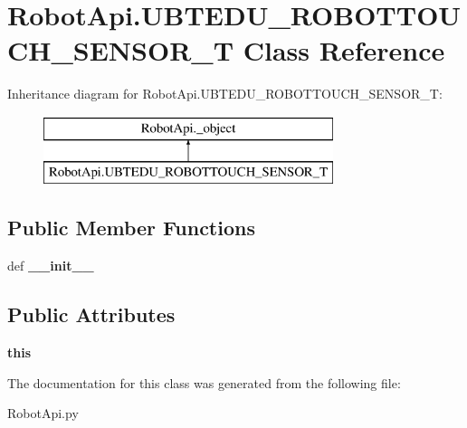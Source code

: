 \hypertarget{classRobotApi_1_1UBTEDU__ROBOTTOUCH__SENSOR__T}{\section{Robot\+Api.\+U\+B\+T\+E\+D\+U\+\_\+\+R\+O\+B\+O\+T\+T\+O\+U\+C\+H\+\_\+\+S\+E\+N\+S\+O\+R\+\_\+\+T Class Reference}
\label{classRobotApi_1_1UBTEDU__ROBOTTOUCH__SENSOR__T}
}
Inheritance diagram for Robot\+Api.\+U\+B\+T\+E\+D\+U\+\_\+\+R\+O\+B\+O\+T\+T\+O\+U\+C\+H\+\_\+\+S\+E\+N\+S\+O\+R\+\_\+\+T\+:\begin{figure}[H]
\begin{center}
\leavevmode
\includegraphics[height=2.000000cm]{classRobotApi_1_1UBTEDU__ROBOTTOUCH__SENSOR__T}
\end{center}
\end{figure}
\subsection*{Public Member Functions}
\begin{DoxyCompactItemize}
\item 
\hypertarget{classRobotApi_1_1UBTEDU__ROBOTTOUCH__SENSOR__T_a578adc374757bf61f2b3f94d7a7cd35e}{def {\bfseries \+\_\+\+\_\+init\+\_\+\+\_\+}}\label{classRobotApi_1_1UBTEDU__ROBOTTOUCH__SENSOR__T_a578adc374757bf61f2b3f94d7a7cd35e}

\end{DoxyCompactItemize}
\subsection*{Public Attributes}
\begin{DoxyCompactItemize}
\item 
\hypertarget{classRobotApi_1_1UBTEDU__ROBOTTOUCH__SENSOR__T_a6620a28cac3af1fb80a2c779c287e597}{{\bfseries this}}\label{classRobotApi_1_1UBTEDU__ROBOTTOUCH__SENSOR__T_a6620a28cac3af1fb80a2c779c287e597}

\end{DoxyCompactItemize}


The documentation for this class was generated from the following file\+:\begin{DoxyCompactItemize}
\item 
Robot\+Api.\+py\end{DoxyCompactItemize}
